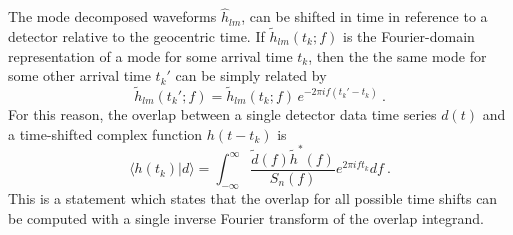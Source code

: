 The mode decomposed waveforms $\hat{h}_{lm}$, can be shifted in time in reference to a detector relative to the geocentric time. If $\tilde{h}_{lm}(t_k;f)$ is the Fourier-domain representation of a mode for some arrival time $t_k$, then
the the same mode for some other arrival time $t_k'$ can be simply related by
\begin{equation} \label{eq:time_shift}
\tilde{h}_{lm}(t_k';f) = \tilde{h}_{lm}(t_k;f) \, e^{- 2 \pi i f (t_k' - t_k)}\ .
\end{equation}
For this reason, the overlap between a single detector data time series  $d(t)$ and a time-shifted complex function $h(t-t_k)$ is 
\begin{equation} \label{eq:IFFT}
\langle h(t_k) | d \rangle = \int_{-\infty}^{\infty} \frac{\tilde{d}(f) \tilde{h}^*(f)}{S_n(f)} e^{2\pi i f t_k} df \ .
\end{equation}
This is a statement which states that the overlap for all possible time shifts can be computed with a single inverse Fourier transform of the overlap integrand.




